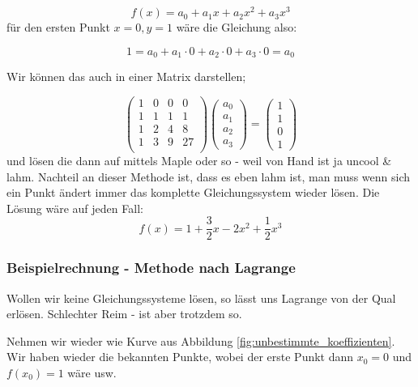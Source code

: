 \begin{displaymath}
f(x) = a_0 + a_1x + a_2x^2 + a_3x^3
\end{displaymath}
für den ersten Punkt \(x = 0, y = 1\) wäre die Gleichung also:

\begin{displaymath}
1 = a_0 + a_1\cdot 0 + a_2\cdot 0 + a_3\cdot 0 = a_0
\end{displaymath}

Wir können das auch in einer Matrix darstellen;

\begin{displaymath}
\begin{pmatrix}
	1 & 0 & 0 & 0 \\
	1 & 1 & 1 & 1 \\
	1 & 2 & 4 & 8 \\
	1 & 3 & 9 & 27\\
\end{pmatrix}
\begin{pmatrix}
a_0 \\
a_1 \\
a_2 \\
a_3
\end{pmatrix}
= 
\begin{pmatrix}
1 \\
1 \\
0 \\
1
\end{pmatrix}
\end{displaymath}
und lösen die dann auf mittels Maple oder so - weil von Hand ist ja uncool \& lahm.
Nachteil an dieser Methode ist, dass es eben lahm ist, man muss wenn sich ein Punkt ändert immer das komplette Gleichungssystem wieder lösen. Die Lösung wäre auf jeden Fall:
\begin{displaymath}
f(x) = 1 + \frac{3}{2}x - 2x^2 + \frac{1}{2}x^3
\end{displaymath}
\subsubsection{Beispielrechnung - Methode nach Lagrange}
Wollen wir keine Gleichungssysteme lösen, so lässt uns Lagrange von der Qual erlösen. Schlechter Reim - ist aber trotzdem so.

Nehmen wir wieder wie Kurve aus Abbildung \ref{fig:unbestimmte_koeffizienten}. Wir haben wieder die bekannten Punkte, wobei der erste Punkt dann \(x_0 = 0\) und \(f(x_0) = 1\)  wäre usw.

